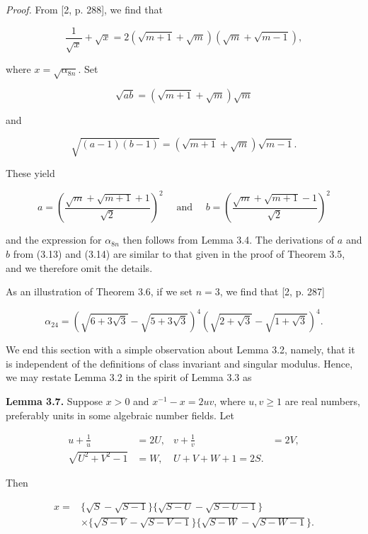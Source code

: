 \documentclass[11pt,letterpaper]{article}
\begin{document}
\noindent\textit{Proof.} From [2, p. 288], we find that

\[
\frac{1}{\sqrt{x}}+\sqrt{x}=2(\sqrt{m+1}+\sqrt{m})(\sqrt{m}+\sqrt{m-1}),
\]

where $x=\sqrt{\alpha_{8 n}}$. Set


\begin{equation*}
\sqrt{a b}=(\sqrt{m+1}+\sqrt{m}) \sqrt{m} \tag{3.13}\label{eq:3.13}
\end{equation*}


and


\begin{equation*}
\sqrt{(a-1)(b-1)}=(\sqrt{m+1}+\sqrt{m}) \sqrt{m-1} . \tag{3.14}\label{eq:3.14}
\end{equation*}


These yield

\[
a=\left(\frac{\sqrt{m}+\sqrt{m+1}+1}{\sqrt{2}}\right)^{2} \quad \text { and } \quad b=\left(\frac{\sqrt{m}+\sqrt{m+1}-1}{\sqrt{2}}\right)^{2}
\]

and the expression for $\alpha_{8 n}$ then follows from Lemma 3.4. The derivations of $a$ and $b$ from (3.13) and (3.14) are similar to that given in the proof of Theorem 3.5, and we therefore omit the details.

As an illustration of Theorem 3.6, if we set $n=3$, we find that [2, p. 287]

\[
\alpha_{24}=(\sqrt{6+3 \sqrt{3}}-\sqrt{5+3 \sqrt{3}})^{4}(\sqrt{2+\sqrt{3}}-\sqrt{1+\sqrt{3}})^{4} .
\]

We end this section with a simple observation about Lemma 3.2, namely, that it is independent of the definitions of class invariant and singular modulus. Hence, we may restate Lemma 3.2 in the spirit of Lemma 3.3 as

\noindent\textbf{Lemma 3.7.} Suppose $x>0$ and $x^{-1}-x=2uv$, where $u,v\geq1$ are real numbers, preferably units in some algebraic number fields. Let

\[
\begin{array}{rlrl}
u+\frac{1}{u} & =2 U, & v+\frac{1}{v} & =2 V, \\
\sqrt{U^{2}+V^{2}-1} & =W, & U+V+W+1=2 S .
\end{array}
\]

Then

\[
\begin{aligned}
x= & \{\sqrt{S}-\sqrt{S-1}\}\{\sqrt{S-U}-\sqrt{S-U-1}\} \\
& \times\{\sqrt{S-V}-\sqrt{S-V-1}\}\{\sqrt{S-W}-\sqrt{S-W-1}\} .
\end{aligned}
\]
\end{document}
